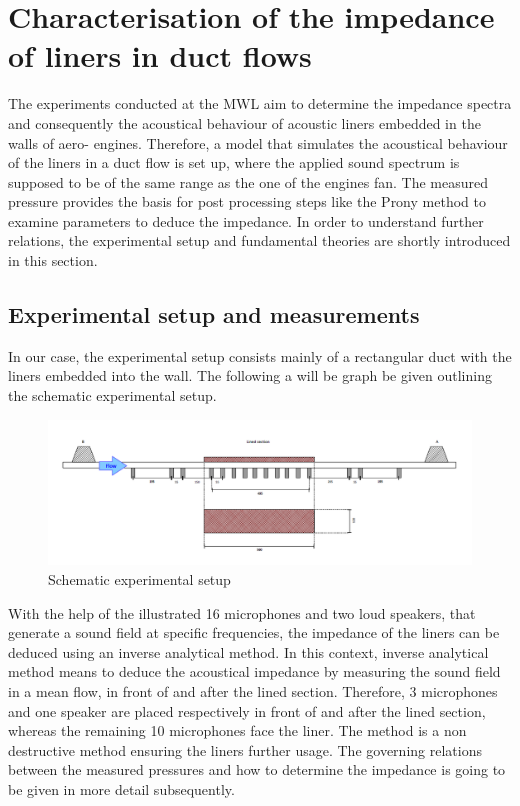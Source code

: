 \documentclass[11pt]{report} %
\begin{document}
\section{Characterisation of the impedance of liners in duct flows}
The experiments conducted at the MWL aim to determine the impedance spectra and consequently the acoustical behaviour of acoustic liners embedded in the walls of aero- engines.
Therefore, a model that simulates the acoustical behaviour of the liners in a duct flow is set up, where the applied sound spectrum is supposed to be of the same range as the one of the engines fan.  
The measured pressure provides the basis for post processing steps like the Prony method to examine parameters to deduce the impedance.
In order to understand further relations, the experimental setup and fundamental theories are shortly introduced in this section. 


\subsection{Experimental setup and measurements}
In our case, the experimental setup consists mainly of a rectangular duct with the liners embedded into the wall.
The following a will be graph be given outlining the schematic experimental setup. 

\begin{figure}[H]
\centering
\includegraphics[scale=0.8]{./Figures/experimental_setup}
\caption{Schematic experimental setup}
\end{figure}

With the help of the illustrated 16 microphones and two loud speakers, that generate a sound field at specific frequencies, the impedance of the liners can be deduced using an inverse analytical method.
In this context, inverse analytical method means to deduce the acoustical impedance by measuring the sound field in a mean flow, in front of and after the lined section.
Therefore, 3 microphones and one speaker are placed respectively in front of and after the lined section, whereas the remaining 10 microphones face the liner.
The method is a non destructive method ensuring the liners further usage.
The governing relations between the measured pressures and how to determine the impedance is going to be given in more detail subsequently.
\end{document}
